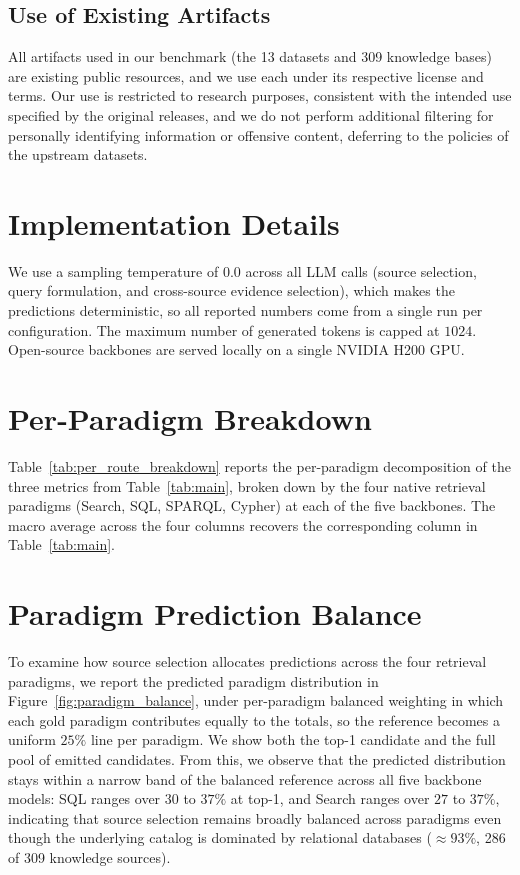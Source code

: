 \documentclass{llmxive}
\begin{document}
{\subsection{Use of Existing Artifacts}
\label{sec:appendix_artifacts}
All artifacts used in our benchmark (the 13 datasets and 309 knowledge bases) are existing public resources, and we use each under its respective license and terms. Our use is restricted to research purposes, consistent with the intended use specified by the original releases, and we do not perform additional filtering for personally identifying information or offensive content, deferring to the policies of the upstream datasets.

\section{Implementation Details}
\label{sec:appendix_implementation}
We use a sampling temperature of $0.0$ across all LLM calls (source selection, query formulation, and cross-source evidence selection), which makes the predictions deterministic, so all reported numbers come from a single run per configuration. The maximum number of generated tokens is capped at $1024$. Open-source backbones are served locally on a single NVIDIA H200 GPU.

\section{Per-Paradigm Breakdown}
\label{sec:appendix_per_paradigm}
Table~\ref{tab:per_route_breakdown} reports the per-paradigm decomposition of the three metrics from Table~\ref{tab:main}, broken down by the four native retrieval paradigms (Search, SQL, SPARQL, Cypher) at each of the five backbones. The macro average across the four columns recovers the corresponding column in Table~\ref{tab:main}.

\section{Paradigm Prediction Balance}
\label{sec:appendix_paradigm_balance}
To examine how source selection allocates predictions across the four retrieval paradigms, we report the predicted paradigm distribution in Figure~\ref{fig:paradigm_balance}, under per-paradigm balanced weighting in which each gold paradigm contributes equally to the totals, so the reference becomes a uniform $25\%$ line per paradigm. We show both the top-1 candidate and the full pool of emitted candidates. From this, we observe that the predicted distribution stays within a narrow band of the balanced reference across all five backbone models: SQL ranges over $30$ to $37\%$ at top-1, and Search ranges over $27$ to $37\%$, indicating that source selection remains broadly balanced across paradigms even though the underlying catalog is dominated by relational databases ($\approx 93\%$, 286 of 309 knowledge sources).

}
\end{document}
